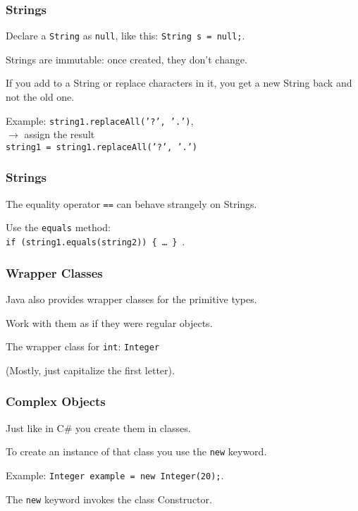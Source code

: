 \begin{frame}
\frametitle{Strings}
\begin{changemargin}{1cm}

Declare a \texttt{String} as \texttt{null}, like this: \texttt{String s = null;}.

Strings are immutable: once created, they don't change. 

If you add to a String or replace characters in it, you get a new String back and not the old one. 

Example: \texttt{string1.replaceAll('?', '.')}, \\
$\rightarrow$ assign the result\\
\texttt{string1 = string1.replaceAll('?', '.')}

\end{changemargin}
\end{frame}


\begin{frame}
\frametitle{Strings}
\begin{changemargin}{1cm}

The equality operator \texttt{==} can behave strangely on Strings. 

Use the \texttt{equals} method:\\
\quad \texttt{if (string1.equals(string2)) \{ \ldots~\} }.

\end{changemargin}
\end{frame}


\begin{frame}
\frametitle{Wrapper Classes}
\begin{changemargin}{1cm}
Java also provides wrapper classes for the primitive types.

Work with them as if they were regular objects. 

The wrapper class for \texttt{int}: \texttt{Integer} 

(Mostly, just capitalize the first letter). 
\end{changemargin}
\end{frame}

\begin{frame}
\frametitle{Complex Objects}
\begin{changemargin}{1cm}
Just like in C\# you create them in classes. 

To create an instance of that class you use the \texttt{new} keyword. 

Example: \texttt{Integer example = new Integer(20);}. 

The \texttt{new} keyword invokes the class Constructor.
\end{changemargin}
\end{frame}

